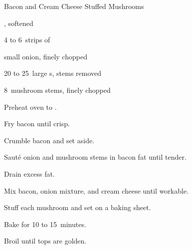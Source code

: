 \begin{recipe}{Bacon and Cream Cheese Stuffed Mushrooms}{}{}

\begin{ingredients}
\item {} , softened
\item 4 to 6~strips of 
\item small onion, finely chopped
\item 20 to 25~large s, stems removed
\item 8~mushroom stems, finely chopped
\end{ingredients}

\begin{directions}
\item Preheat oven to .
\item Fry bacon until crisp.
\item Crumble bacon and set aside.
\item Saut\'e onion and mushroom stems in bacon fat until tender.
\item Drain excess fat.
\item Mix bacon, onion mixture, and cream cheese until workable.
\item Stuff each mushroom and set on a baking sheet.
\item Bake for 10 to 15~minutes.
\item Broil until tops are golden.
\end{directions}

\end{recipe}
